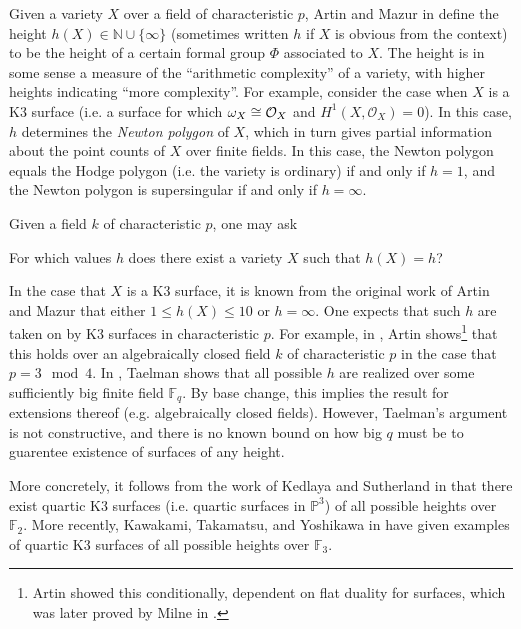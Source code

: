 Given a variety \(X\) over a field of characteristic \(p\),
Artin and Mazur in \cite{artin-mazur-1977-height}
define the height \(h(X) \in \mathbb{N} \cup \{\infty\}\) 
(sometimes written \(h\) if \(X\) is obvious from the context)
to be the height 
of a certain formal group \(\Phi\) associated to \(X\).
The height is in some sense a measure of the
``arithmetic complexity'' of a variety,
with higher heights indicating ``more complexity''.
For example, consider the case when \(X\) is a 
K3 surface (i.e. a surface for which \(\omega_{X} \cong \mathcal{O}_{X} \) 
and \(H^{1}(X,\mathcal{O}_{X} ) = 0\)).
In this case, \(h\) determines the \textit{Newton polygon}
of \(X\), which in turn gives partial information about the 
point counts of \(X\) over finite fields.
In this case, the Newton polygon equals the Hodge polygon
(i.e. the variety is ordinary) if and only if \(h=1\),
and the Newton polygon is supersingular if and only if 
\(h = \infty\).

Given a field \(k\) of characteristic \(p\), one may ask

\begin{quest}
    For which values \(h\) does there exist a variety
    \(X\) such that \(h(X) = h\)?
\end{quest}

In the case that \(X\) is a K3 surface, it is known from the 
original work of Artin and Mazur
that either \(1 \leq h(X) \leq 10\) or \(h = \infty\).
One expects that such $h$ are taken on by K3 surfaces
in characteristic $p$.
For example, in \cite{artin-1974-k3-surfaces},
Artin shows\footnote{
    Artin showed this conditionally, dependent on flat
    duality for surfaces, which was later proved
    by Milne in \cite{milne-1976-flat-duality}.
}
that this holds over an algebraically
closed field \(k\) of characteristic \(p\) in the
case that \(p = 3 \mod 4\).
In \cite{taelman-2016-k3-given-l-function}, 
Taelman shows that
all possible \(h\) are realized
over some sufficiently big finite field \(\mathbb{F}_{q}\). 
By base change, this implies the result for extensions
thereof (e.g. algebraically closed fields).
However, Taelman's argument is not constructive,
and there is no known bound on how big \(q\) must be to guarentee
existence of surfaces of any height.

More concretely, it follows from the work of
Kedlaya and Sutherland in 
\cite{kedlaya-sutherland-2016-census-k3-f2}
that there exist quartic K3 surfaces
(i.e. quartic surfaces in \(\mathbb{P}^{3}\))
of all possible heights over \(\mathbb{F}_{2}\).
More recently,
Kawakami, Takamatsu, and Yoshikawa in \cite{kty-2022-fedder}
have given examples of quartic K3 surfaces
of all possible heights over \(\mathbb{F}_{3}\).

